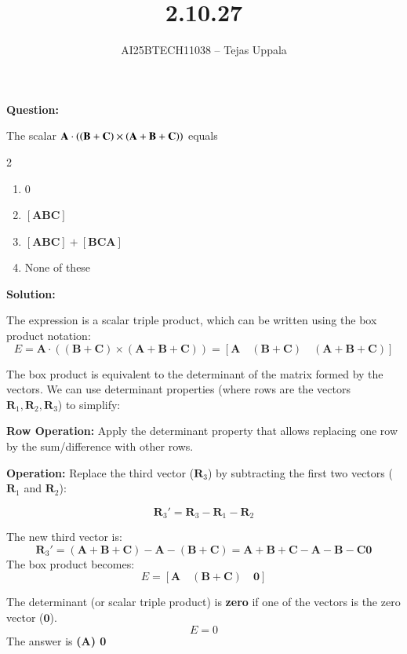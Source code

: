 \documentclass[journal,12pt,onecolumn]{IEEEtran}
\begin{document}
\title{2.10.27}
\author{AI25BTECH11038 -- Tejas Uppala}
{\let\newpage\relax\maketitle}

\textbf{Question:}

\noindent The scalar $\textbf{A}\cdot\left(\left(\textbf{B} + \textbf{C}\right)\times\left(\textbf{A} + \textbf{B} + \textbf{C}\right)\right)$ equals

\begin{multicols}{2}
\begin{enumerate}
    \item $0$
    \item $[\textbf{A} \textbf{B} \textbf{C}]$
    \item $[\textbf{A} \textbf{B} \textbf{C}] + [\textbf{B} \textbf{C} \textbf{A}]$
    \item None of these
\end{enumerate}
\end{multicols}

\textbf{Solution:}

\noindent The expression is a scalar triple product, which can be written using the box product notation:
\begin{equation}
E = \mathbf{A} \cdot ((\mathbf{B} + \mathbf{C}) \times (\mathbf{A} + \mathbf{B} + \mathbf{C})) = [\mathbf{A} \quad (\mathbf{B} + \mathbf{C}) \quad (\mathbf{A} + \mathbf{B} + \mathbf{C})]    
\end{equation}

\noindent The box product is equivalent to the determinant of the matrix formed by the vectors. We can use determinant properties (where rows are the vectors $\mathbf{R}_1, \mathbf{R}_2, \mathbf{R}_3$) to simplify:

\textbf{Row Operation:} Apply the determinant property that allows replacing one row by the sum/difference with other rows.

\textbf{Operation:} Replace the third vector ($\mathbf{R}_3$) by subtracting the first two vectors ($\mathbf{R}_1$ and $\mathbf{R}_2$):

\begin{equation}
    \mathbf{R}_3' = \mathbf{R}_3 - \mathbf{R}_1 - \mathbf{R}_2
\end{equation}

The new third vector is:
\begin{equation}
 \mathbf{R}_3' = (\mathbf{A} + \mathbf{B} + \mathbf{C}) - \mathbf{A} - (\mathbf{B} + \mathbf{C}) = \mathbf{A} + \mathbf{B} + \mathbf{C} - \mathbf{A} - \mathbf{B} - \mathbf{C}  \mathbf{0}   
\end{equation}
The box product becomes:
\begin{equation}
    E = [\mathbf{A} \quad (\mathbf{B} + \mathbf{C}) \quad \mathbf{0}]
\end{equation}

The determinant (or scalar triple product) is \textbf{zero} if one of the vectors is the zero vector ($\mathbf{0}$).
$$E = 0$$
The answer is \textbf{(A) 0}
\end{document}

